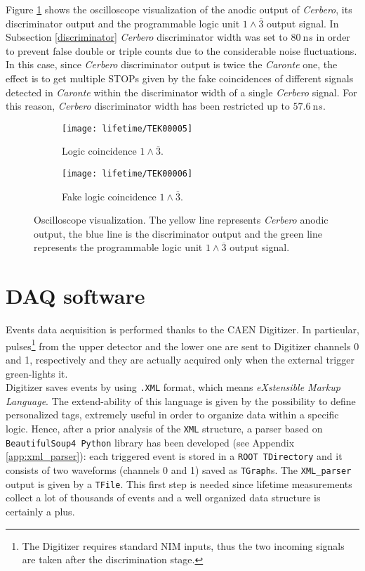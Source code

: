 Figure \ref{fig:fin} shows the oscilloscope visualization of the anodic output of \emph{Cerbero}, its discriminator output and the programmable logic unit $1 \land \overline{3}$ output signal. In Subsection \ref{discriminator} \emph{Cerbero} discriminator width was set to $\SI{80}{\nano s}$ in order to prevent false double or triple counts due to the considerable noise fluctuations. In this case, since \emph{Cerbero} discriminator output is twice the \emph{Caronte} one, the effect is to get multiple STOPs given by the fake coincidences of different signals detected in \emph{Caronte} within the discriminator width of a single \emph{Cerbero} signal.
For this reason, \emph{Cerbero} discriminator width has been restricted up to $\SI{57.6}{\nano s}$.


\begin{figure}[!htp]
	\centering
	\begin{subfigure}{.45\linewidth}
		\centering
		\texttt{[image: lifetime/TEK00005]}
		\caption{Logic coincidence $1 \land \overline 3$.}
	\end{subfigure}\hfill
	\begin{subfigure}{.45\linewidth}
		\centering
		\texttt{[image: lifetime/TEK00006]}
		\caption{Fake logic coincidence $1 \land \overline 3$.}
	\end{subfigure}
	\caption{Oscilloscope visualization. The yellow line represents \emph{Cerbero} anodic output, the blue line is the discriminator output and the green line represents the programmable logic unit $1 \land \overline{3}$ output signal.}
	\label{fig:fin}
\end{figure}

\section{DAQ software}
\label{DAQ}
Events data acquisition is performed thanks to the CAEN Digitizer. In particular, pulses\footnote{The Digitizer requires standard NIM inputs, thus the two incoming signals are taken after the discrimination stage.} from the upper detector and the lower one are sent to Digitizer channels 0 and 1, respectively and they are actually acquired only when the external trigger green-lights it.\\

Digitizer saves events by using \texttt{.XML} format, which means \emph{eXstensible Markup Language}. The extend-ability of this language is given by the possibility to define personalized tags, extremely useful in order to organize data within a specific logic. Hence, after a prior analysis of the \texttt{XML} structure, a parser based on \texttt{BeautifulSoup4 Python} library has been developed (see Appendix \ref{app:xml_parser}): each triggered event is stored in a \texttt{ROOT TDirectory} and it consists of two waveforms (channels 0 and 1) saved as \texttt{TGraph}s. The \texttt{XML\_parser} output is given by a \texttt{TFile}. This first step is needed since lifetime measurements collect a lot of thousands of events and a well organized data structure is certainly a plus.\\

